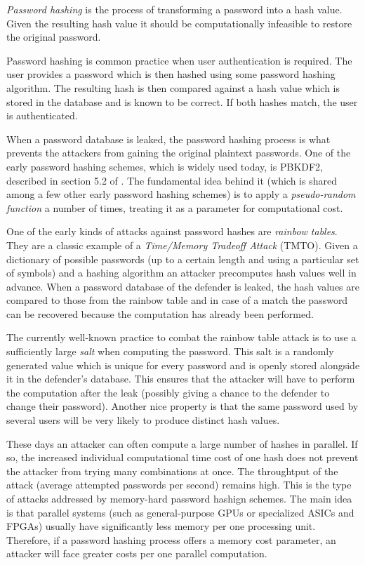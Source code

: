 \emph{Password hashing} is the process of transforming a password into a hash value. Given the resulting hash value it should be computationally infeasible to restore the original password.

Password hashing is common practice when user authentication is required. The user provides a password which is then hashed using some password hashing algorithm. The resulting hash is then compared against a hash value which is stored in the database and is known to be correct. If both hashes match, the user is authenticated.

When a password database is leaked, the password hashing process is what prevents the attackers from gaining the original plaintext passwords. One of the early password hashing schemes, which is widely used today, is PBKDF2, described in section 5.2 of \cite{moriarty:2017:pkcs}. The fundamental idea behind it (which is shared among a few other early password hashing schemes) is to apply a \emph{pseudo-random function} a number of times, treating it as a parameter for computational cost.

One of the early kinds of attacks against password hashes are \emph{rainbow tables}. They are a classic example of a \emph{Time/Memory Tradeoff Attack} (TMTO). Given a dictionary of possible passwords (up to a certain length and using a particular set of symbols) and a hashing algorithm an attacker precomputes hash values well in advance. When a password database of the defender is leaked, the hash values are compared to those from the rainbow table and in case of a match the password can be recovered because the computation has already been performed.

The currently well-known practice to combat the rainbow table attack is to use a sufficiently large \emph{salt} when computing the password. This salt is a randomly generated value which is unique for every password and is openly stored alongside it in the defender's database. This ensures that the attacker will have to perform the computation after the leak (possibly giving a chance to the defender to change their password). Another nice property is that the same password used by several users will be very likely to produce distinct hash values.

These days an attacker can often compute a large number of hashes in parallel. If so, the increased individual computational time cost of one hash does not prevent the attacker from trying many combinations at once. The throughtput of the attack (average attempted passwords per second) remains high. This is the type of attacks addressed by memory-hard password hashign schemes. The main idea is that parallel systems (such as general-purpose GPUs or specialized ASICs and FPGAs) usually have significantly less memory per one processing unit. Therefore, if a password hashing process offers a memory cost parameter, an attacker will face greater costs per one parallel computation.

